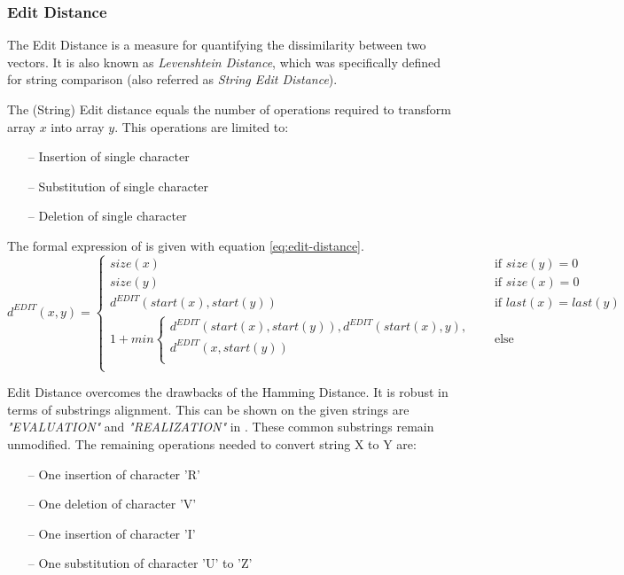 \subsubsection{Edit Distance}
The Edit Distance  is a measure for quantifying the dissimilarity between two vectors\cite{Jurafsky:2009:SLP:1214993}.
It is also known as \emph{Levenshtein Distance}, which was specifically defined for string comparison 
(also referred as \emph{String Edit Distance})\cite{Navarro:2001:GTA:375360.375365}.

The (String) Edit distance equals the number of operations required to transform array $x$ into array $y$. 
This operations are limited to:
\begin{itemize}
	\item[--] Insertion of single character
	\item[--] Substitution of single character
	\item[--] Deletion of single character
\end{itemize}

The formal expression of is given with equation \ref{eq:edit-distance}.
\begin{equation}
	d^{EDIT}(x,y) = 	
	\begin{cases}
	size(x)	  & \quad \text{if } size(y)=0 \\
	size(y)	  & \quad \text{if } size(x)=0 \\
	d^{EDIT}(start(x),start(y))	  & \quad \text{if } last(x)=last(y) \\
	1 + min\begin{cases}
		d^{EDIT}(start(x),start(y)),
		d^{EDIT}(start(x),y), \\
		d^{EDIT}(x,start(y)) \\
		\end{cases} & \quad \text{else }\\
	\end{cases} 
	\label{eq:edit-distance}
\end{equation}

Edit Distance overcomes the drawbacks of the Hamming Distance. 
It is robust in terms of substrings alignment. 
This can be shown on the given strings are \emph{"EVALUATION"} and \emph{"REALIZATION"} in .
These common substrings remain unmodified. 
The remaining operations needed to convert string X to Y are:
\begin{itemize}
	\item[--] One insertion of character 'R'
	\item[--] One deletion of character 'V'
	\item[--] One insertion of character 'I'
	\item[--] One substitution of character 'U' to 'Z'
\end{itemize}

